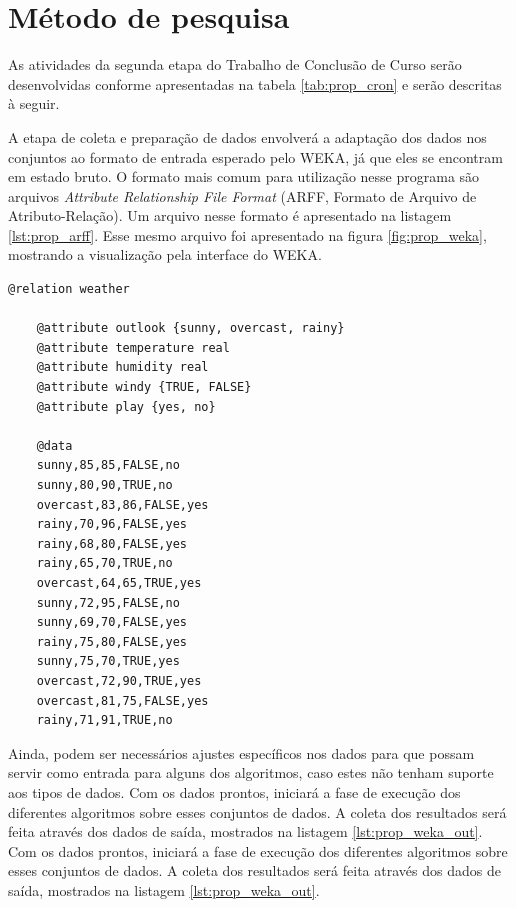 \section{Método de pesquisa}

As atividades da segunda etapa do Trabalho de Conclusão de Curso serão desenvolvidas conforme apresentadas na tabela \ref{tab:prop_cron} e serão descritas à seguir.

A etapa de coleta e preparação de dados envolverá a adaptação dos dados nos conjuntos ao formato de entrada esperado pelo WEKA, já que eles se encontram em estado bruto. O formato mais comum para utilização nesse programa são arquivos \emph{Attribute Relationship File Format} (ARFF, Formato de Arquivo de Atributo-Relação). Um arquivo nesse formato é apresentado na listagem \ref{lst:prop_arff}. Esse mesmo arquivo foi apresentado na figura \ref{fig:prop_weka}, mostrando a visualização pela interface do WEKA.

\vspace{1cm}
\begin{lstlisting}[caption=Exemplo de arquivo no formato ARFF, label=lst:prop_arff]
    @relation weather

    @attribute outlook {sunny, overcast, rainy}
    @attribute temperature real
    @attribute humidity real
    @attribute windy {TRUE, FALSE}
    @attribute play {yes, no}

    @data
    sunny,85,85,FALSE,no
    sunny,80,90,TRUE,no
    overcast,83,86,FALSE,yes
    rainy,70,96,FALSE,yes
    rainy,68,80,FALSE,yes
    rainy,65,70,TRUE,no
    overcast,64,65,TRUE,yes
    sunny,72,95,FALSE,no
    sunny,69,70,FALSE,yes
    rainy,75,80,FALSE,yes
    sunny,75,70,TRUE,yes
    overcast,72,90,TRUE,yes
    overcast,81,75,FALSE,yes
    rainy,71,91,TRUE,no
\end{lstlisting}
\vspace{1cm}

Ainda, podem ser necessários ajustes específicos nos dados para que possam servir como entrada para alguns dos algoritmos, caso estes não tenham suporte aos tipos de dados. Com os dados prontos, iniciará a fase de execução dos diferentes algoritmos sobre esses conjuntos de dados. A coleta dos resultados será feita através dos dados de saída, mostrados na listagem \ref{lst:prop_weka_out}. Com os dados prontos, iniciará a fase de execução dos diferentes algoritmos sobre esses conjuntos de dados. A coleta dos resultados será feita através dos dados de saída, mostrados na listagem \ref{lst:prop_weka_out}.

